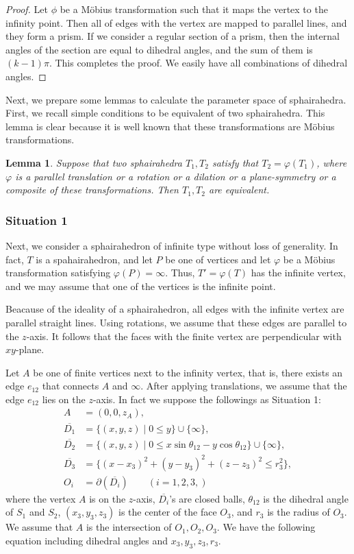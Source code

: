 \documentclass[suppldata, dvipdfmx]{interact}
\theoremstyle{plain}%
\newtheorem{lemma}[theorem]{Lemma}
\theoremstyle{definition}
\theoremstyle{remark}
\theoremstyle{problemstyle}
\begin{document}
\begin{proof}
 Let $\phi$ be a M\"obius transformation such that it maps the vertex to
 the infinity point. Then all of edges with the vertex are mapped to
 parallel lines, and they form a prism. If we consider a
 regular section of a prism, then the internal angles of the section 
 are equal to dihedral angles, and the sum of them is $(k-1)\pi$.  This
 completes the proof.  We easily have all combinations of dihedral angles.
\end{proof}

Next, we prepare some lemmas to calculate the parameter space of sphairahedra. First, we recall simple conditions to be equivalent of two sphairahedra.  This lemma is clear because it is well known that these transformations are M\"obius transformations. 

\begin{lemma} \label{lemma:equivalentOfSH}
Suppose that two sphairahedra $T_1, T_2$ satisfy that $T_2=\varphi(T_1)$, where $\varphi$ is a parallel translation or a rotation or a dilation or a plane-symmetry or a composite of these transformations.  Then $T_1, T_2$ are equivalent. 
\end{lemma}

\subsubsection{Situation 1}
Next, we consider a sphairahedron of infinite type without loss of generality.  In fact, $T$ is a spahairahedron, and  let $P$ be one of vertices and let $\varphi$ be a M\"obius transformation satisfying $\varphi(P)=\infty$.  Thus, $T'=\varphi(T)$ has the infinite vertex, and we may assume that one of the vertices is the infinite point.

Beacause of the ideality of a sphairahedron, all edges with the infinite vertex are parallel straight lines.  Using rotations, we assume that these edges are parallel to the $z$-axis.  It follows that the faces with the finite vertex are perpendicular with $xy$-plane.

Let $A$ be one of finite vertices next to the infinity vertex, that is, there exists an edge $e_{12}$ that connects $A$ and $\infty$.  After applying translations, we assume that the edge $e_{12}$ lies on the $z$-axis.  In fact we suppose the followings as Situation 1:
\begin{align*}
A &= (0,0,z_A),\\ 
\overline{D_1}  &= \{ (x,y,z) \mid 0 \le y \} \cup \{\infty\} ,\\
\overline{D_2}  &= \{ (x,y,z) \mid 0 \le x\sin\theta_{12} - y\cos\theta_{12} \}\cup \{\infty\} ,\\
\overline{D_3}  &= \{ (x-x_3)^2+(y-y_3)^2+(z-z_3)^2 \le r_3^2 \}, \\
O_i & = \partial(\overline{D_i}) \qquad(i=1,2,3,)
\end{align*}
where the vertex $A$ is on the $z$-axis, $\overline{D_i}$'s are closed balls, $\theta_{12}$ is the dihedral angle of $S_1$ and $S_2$,  $(x_3, y_3, z_3)$ is the center of the face $O_3$, and $r_3$ is the radius of $O_3$.  We assume that $A$ is the intersection of $O_1, O_2, O_3$.  We have the following equation including dihedral angles and  $x_3, y_3, z_3, r_3$.
\end{document}
